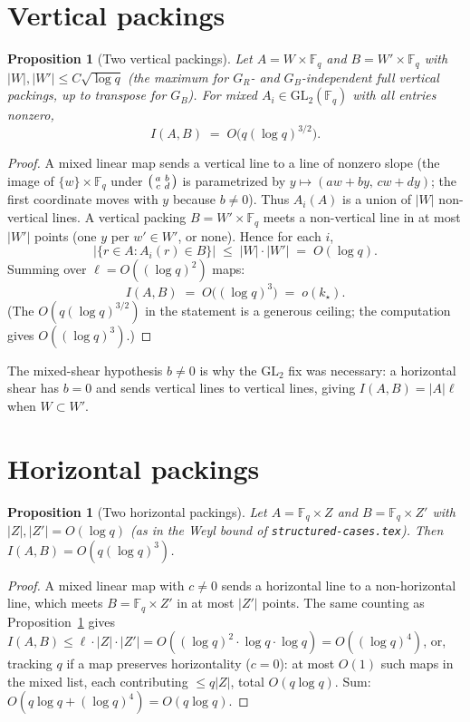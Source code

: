\documentclass[11pt]{article}
\newtheorem{proposition}[theorem]{Proposition}
\theoremstyle{definition}
\newcommand{\F}{\mathbb{F}}
\begin{document}
\section{Vertical packings}

\begin{proposition}[Two vertical packings]\label{prop:VV}
Let $A=W\times\F_q$ and $B=W'\times\F_q$ with $|W|,|W'|\le C\sqrt{\log q}$
(the maximum for $G_R$- and $G_B$-independent full vertical packings, up to transpose for $G_B$).
For mixed $A_i\in\mathrm{GL}_2(\F_q)$ with all entries nonzero,
\[
  I(A,B)\;=\;O\bigl(q(\log q)^{3/2}\bigr).
\]
\end{proposition}

\begin{proof}
A mixed linear map sends a vertical line to a line of nonzero slope (the image of $\{w\}\times\F_q$ under $\begin{psmallmatrix}a&b\\c&d\end{psmallmatrix}$ is parametrized by $y\mapsto(aw+by,\,cw+dy)$; the first coordinate moves with $y$ because $b\ne 0$).
Thus $A_i(A)$ is a union of $|W|$ non-vertical lines.
A vertical packing $B=W'\times\F_q$ meets a non-vertical line in at most $|W'|$ points
(one $y$ per $w'\in W'$, or none).
Hence for each $i$,
\[
  |\{r\in A:A_i(r)\in B\}|
  \;\le\;
  |W|\cdot|W'|
  \;=\;
  O(\log q).
\]
Summing over $\ell=O((\log q)^{2})$ maps:
\[
  I(A,B)
  \;=\;
  O\bigl((\log q)^{3}\bigr)
  \;=\;
  o(k_{\star}).
\]
(The $O(q(\log q)^{3/2})$ in the statement is a generous ceiling; the computation gives $O((\log q)^{3})$.)
\end{proof}

The mixed-shear hypothesis $b\ne 0$ is why the $\mathrm{GL}_2$ fix was necessary: a horizontal shear has $b=0$ and sends vertical lines to vertical lines, giving $I(A,B)=|A|\ell$ when $W\subset W'$.

\section{Horizontal packings}

\begin{proposition}[Two horizontal packings]\label{prop:HH}
Let $A=\F_q\times Z$ and $B=\F_q\times Z'$ with $|Z|,|Z'|=O(\log q)$
(as in the Weyl bound of \texttt{structured-cases.tex}).
Then $I(A,B)=O(q(\log q)^{3})$.
\end{proposition}

\begin{proof}
A mixed linear map with $c\ne 0$ sends a horizontal line to a non-horizontal line, which meets $B=\F_q\times Z'$ in at most $|Z'|$ points.
The same counting as Proposition~\ref{prop:VV} gives
$I(A,B)\le\ell\cdot|Z|\cdot|Z'|=O((\log q)^{2}\cdot\log q\cdot\log q)=O((\log q)^{4})$,
or, tracking $q$ if a map preserves horizontality ($c=0$): at most $O(1)$ such maps in the mixed list, each contributing $\le q|Z|$, total $O(q\log q)$.
Sum: $O(q\log q+(\log q)^{4})=O(q\log q)$.
\end{proof}
\end{document}
